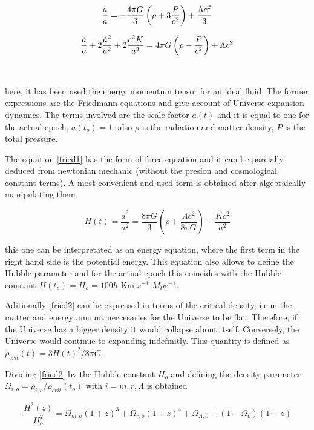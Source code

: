 \begin{equation}
\frac{\ddot{a}}{a} = -\frac{4\pi G}{3 }\left( \rho + 3 \frac{P}{c^2} \right)+\frac{\Lambda c^2}{3} 
\label{fried1}
\end{equation}

\[
\frac{\ddot{a}}{a}+2\frac{\dot{a}^2}{a^2}+2\frac{c^2 K}{a^2} = 4\pi G\left( \rho-\frac{P}{c^2}\right)+\Lambda c^2
\]

\

here, it has been used the energy momentum tensor for an ideal fluid. 
The former expressions are the Friedmann equations and give account 
of Universe expansion dynamics. The terms involved are 
the scale factor $a(t)$ and it is equal to one for the actual epoch,
$a(t_o)=1$, also $\rho$ is the radiation and matter density, $P$ is
the total pressure.  

The equation \ref{fried1} has the form of force equation and it can
be parcially deduced from newtonian mechanic (without the presion
and cosmological constant terms). A most convenient and used form
is obtained after algebraically manipulating them 


\begin{equation}
H(t)=\frac{\dot{a}^2}{a^2}=\frac{8 \pi G}{3}\left(\rho+\frac{\Lambda c^2}{8\pi G}\right) -\frac{Kc^2}{a^2}
\label{fried1}
\end{equation}

this one can be interpretated as an energy equation, where the first term in 
the right hand side is the potential energy. 
This equation also allows to define the Hubble parameter and for the 
actual epoch this coincides with the Hubble constant
$H(t_o)=H_o = 100h$ Km $s^{-1}$ $Mpc^{-1}$.

Aditionally \ref{fried2} can be expressed in terms of the critical
density, i.e.m the matter and energy amount neccesaries for the 
Universe to be flat. Therefore, if the Universe has a bigger density
it would collapse about itself.  Conversely, the Universe would
continue to expanding indefinitly. This quantity is defined as
$\rho_{crit}(t)= 3H(t)^2/8\pi G$.

Dividing \ref{fried2} by the Hubble constant $H_o$ and defining 
the density parameter  $\Omega_{i,o} = \rho_{i,o}/\rho_{crit}(t_o)$ 
with $i=m,r,\Lambda$ is obtained

\begin{equation}
\frac{H^2(z)}{H_o^{2}}=\Omega_{m,o}\left(1+z\right)^3+
\Omega_{r,o}\left(1+z\right)^4+ \Omega_{\Lambda,o} + ( 1-\Omega_o)
\left(1+z\right)
\label{fried2}
\end{equation}


